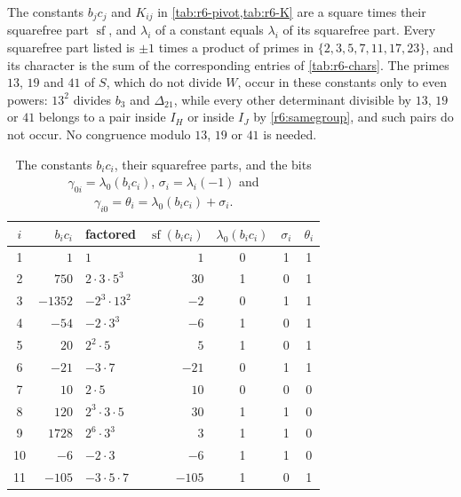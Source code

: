 \documentclass[12pt,oneside,openany]{book}
\theoremstyle{definition}
\theoremstyle{plain}
\numberwithin{equation}{chapter}
\theoremstyle{plain}
\theoremstyle{definition}
\theoremstyle{remark}
\begin{document}
The constants $b_jc_j$ and $K_{ij}$ in \cref{tab:r6-pivot,tab:r6-K} are a square times their squarefree part $\operatorname{sf}$, and $\lambda_i$ of a constant equals $\lambda_i$ of its squarefree part. Every squarefree part listed is $\pm1$ times a product of primes in $\{2,3,5,7,11,17,23\}$, and its character is the sum of the corresponding entries of \cref{tab:r6-chars}. The primes $13$, $19$ and $41$ of $S$, which do not divide $W$, occur in these constants only to even powers: $13^2$ divides $b_3$ and $\Delta_{21}$, while every other determinant divisible by $13$, $19$ or $41$ belongs to a pair inside $I_H$ or inside $I_J$ by \eqref{r6:samegroup}, and such pairs do not occur. No congruence modulo $13$, $19$ or $41$ is needed.

\begin{table}[htbp]
\centering
\caption{The constants $b_ic_i$, their squarefree parts, and the bits $\gamma_{0i}=\lambda_0(b_ic_i)$, $\sigma_i=\lambda_i(-1)$ and $\gamma_{i0}=\theta_i=\lambda_0(b_ic_i)+\sigma_i$.}
\label{tab:r6-pivot}
\begin{tabular}{crlrccc}
\toprule
$i$ & $b_ic_i$ & factored & $\operatorname{sf}(b_ic_i)$ & $\lambda_0(b_ic_i)$ & $\sigma_i$ & $\theta_i$\\
\midrule
1 & $1$ & $1$ & $1$ & 0 & 1 & 1 \\
2 & $750$ & $2\cdot3\cdot5^{3}$ & $30$ & 1 & 0 & 1 \\
3 & $-1352$ & $-2^{3}\cdot13^{2}$ & $-2$ & 0 & 1 & 1 \\
4 & $-54$ & $-2\cdot3^{3}$ & $-6$ & 1 & 0 & 1 \\
5 & $20$ & $2^{2}\cdot5$ & $5$ & 1 & 0 & 1 \\
6 & $-21$ & $-3\cdot7$ & $-21$ & 0 & 1 & 1 \\
7 & $10$ & $2\cdot5$ & $10$ & 0 & 0 & 0 \\
8 & $120$ & $2^{3}\cdot3\cdot5$ & $30$ & 1 & 1 & 0 \\
9 & $1728$ & $2^{6}\cdot3^{3}$ & $3$ & 1 & 1 & 0 \\
10 & $-6$ & $-2\cdot3$ & $-6$ & 1 & 1 & 0 \\
11 & $-105$ & $-3\cdot5\cdot7$ & $-105$ & 1 & 0 & 1 \\
\bottomrule
\end{tabular}
\end{table}
\end{document}
